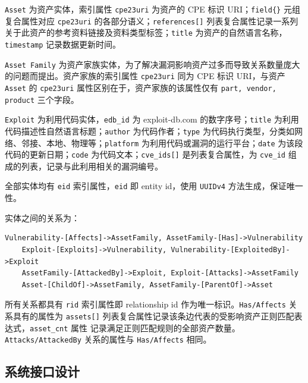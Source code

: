 \documentclass[a4paper,AutoFakeBold,oneside,12pt]{book}
\begin{document}
\lstinline|Asset| 为资产实体，索引属性 \lstinline|cpe23uri| 为资产的 CPE 标识 URI；\lstinline|field{}| 元组复合属性对应 \lstinline|cpe23uri| 的各部分语义；\lstinline|references[]| 列表复合属性记录一系列关于此资产的参考资料链接及资料类型标签；\lstinline|title| 为资产的自然语言名称，\lstinline|timestamp| 记录数据更新时间。

\lstinline|Asset Family| 为资产家族实体，为了解决漏洞影响资产过多而导致关系数量庞大的问题而提出。资产家族的索引属性 \lstinline|cpe23uri| 同为 CPE 标识 URI，与资产 \lstinline|Asset| 的 \lstinline|cpe23uri| 属性区别在于，资产家族的该属性仅有 \lstinline|part, vendor, product| 三个字段。

\lstinline|Exploit| 为利用代码实体，\lstinline|edb_id| 为 exploit-db.com 的数字序号；\lstinline|title| 为利用代码描述性自然语言标题；\lstinline|author| 为代码作者；\lstinline|type| 为代码执行类型，分类如网络、邻接、本地、物理等；\lstinline|platform| 为利用代码或漏洞的运行平台；\lstinline|date| 为该段代码的更新日期；\lstinline|code| 为代码文本；\lstinline|cve_ids[]| 是列表复合属性，为 \lstinline|cve_id| 组成的列表，记录与此利用相关的漏洞编号。

全部实体均有 \lstinline|eid| 索引属性，\lstinline|eid| 即 entity id，使用 \lstinline|UUIDv4| 方法生成，保证唯一性。

实体之间的关系为：

\begin{lstlisting}[label={lst:neo4j_rels},breaklines,style=lgeneral]
	Vulnerability-[Affects]->AssetFamily, AssetFamily-[Has]->Vulnerability
	Exploit-[Exploits]->Vulnerability, Vulnerability-[ExploitedBy]->Exploit
	AssetFamily-[AttackedBy]->Exploit, Exploit-[Attacks]->AssetFamily
	Asset-[ChildOf]->AssetFamily, AssetFamily-[ParentOf]->Asset
\end{lstlisting}

所有关系都具有 \lstinline|rid| 索引属性即 relationship id 作为唯一标识。\lstinline|Has/Affects| 关系具有的属性为 \lstinline|assets[]| 列表复合属性记录该条边代表的受影响资产正则匹配表达式，\lstinline|asset_cnt| 属性
记录满足正则匹配规则的全部资产数量。\lstinline|Attacks/AttackedBy| 关系的属性与 \lstinline|Has/Affects| 相同。

\subsection{系统接口设计}
\end{document}
